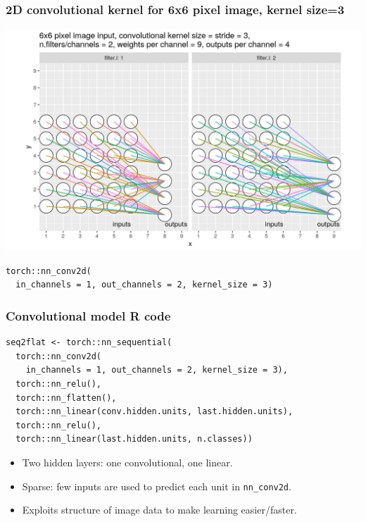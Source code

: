 \documentclass{beamer}
\begin{document}
\begin{frame}[fragile]
  \frametitle{2D convolutional kernel for 6x6 pixel image, kernel size=3}
  \includegraphics[width=\textwidth]{figure-conv2d-6x6-kernel=3}
\begin{verbatim}
torch::nn_conv2d(
  in_channels = 1, out_channels = 2, kernel_size = 3)
\end{verbatim}
\end{frame}

\begin{frame}[fragile]
  \frametitle{Convolutional model R code}

\begin{verbatim}
seq2flat <- torch::nn_sequential(
  torch::nn_conv2d(
    in_channels = 1, out_channels = 2, kernel_size = 3),
  torch::nn_relu(),
  torch::nn_flatten(),
  torch::nn_linear(conv.hidden.units, last.hidden.units),
  torch::nn_relu(),
  torch::nn_linear(last.hidden.units, n.classes))
\end{verbatim}

  \begin{itemize}
  \item Two hidden layers: one convolutional, one linear.
  \item Sparse: few inputs are used to predict each unit in
    \texttt{nn\_conv2d}.
  \item Exploits structure of image data to make learning
    easier/faster.
  \end{itemize}

\end{frame}
 
\end{document}
